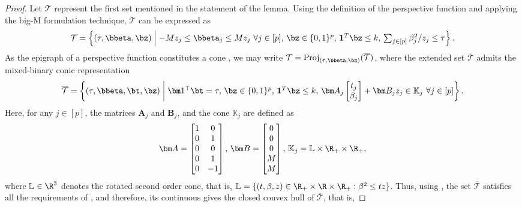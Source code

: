 \begin{proof}
    Let $\mathcal T$ represent the first set mentioned in the statement of the lemma. Using the definition of the perspective function and applying the big-M formulation technique, $\mathcal T$ can be expressed as
    \begin{align*}
        \textstyle \mathcal T = \left\{ (\tau, \bbeta, \bz)  \;\middle|\; -M z_j\leq \bbeta_j \leq M z_j ~ \forall j \in [p], \, \bz \in \{0, 1\}^p, \, \mathbf{1}^T \bz \leq k, \, \sum_{j \in [p]} \beta_j^2 / z_j \leq \tau \right\}.
    \end{align*}
    As the epigraph of a perspective function constitutes a cone \citep[Lemma~1 \& 2]{shafiee2024constrained}, we may write $\mathcal T = \mathrm{Proj}_{(\tau, \bbeta, \bz)}(\overline {\mathcal T})$, where the extended set $\overline {\mathcal T}$ admits the mixed-binary conic representation
    \begin{align*}
        \textstyle \overline {\mathcal T} = \left\{ (\tau, \bbeta, \bt, \bz) \;\middle|\; \bm 1^\top \bt = \tau, \, \bz \in \{0, 1\}^p, \, \mathbf{1}^T \bz \leq k, \, \bm A_j \begin{bmatrix} t_j \\ \beta_j \end{bmatrix} + \bm B_j z_j \in \mathbb K_j ~ \forall j \in [p] \right\}.
    \end{align*}
    Here, for any $j \in [p]$, the matrices $\bm A_j$ and $\bm B_j$, and the cone $\mathbb K_j$ are defined as
    \begin{align*}
        \bm A = \begin{bmatrix} 1 & 0 \\ 0 & 1 \\ 0 & 0 \\ 0 & 1 \\ 0 & -1 \end{bmatrix}, \,
        \bm B = \begin{bmatrix} 0 \\ 0 \\ 0 \\ M \\ M \end{bmatrix}, \,
        \mathbb K_j = \mathbb L \times \R_+ \times \R_+,
    \end{align*}
    where $\mathbb L \in \R^3$ denotes the rotated second order cone, that is, $\mathbb L = \{ (t, \beta, z) \in \R_+ \times \R \times \R_+: \beta^2 \leq t z  \}$.
    Thus, using \citep[Lemma~4]{shafiee2024constrained}, the set $\overline{\mathcal T}$ satisfies all the requirements of \citep[Theorem~1]{shafiee2024constrained}, and therefore, its continuous gives the closed convex hull of $\overline{\mathcal T}$, that is,

\end{proof}
